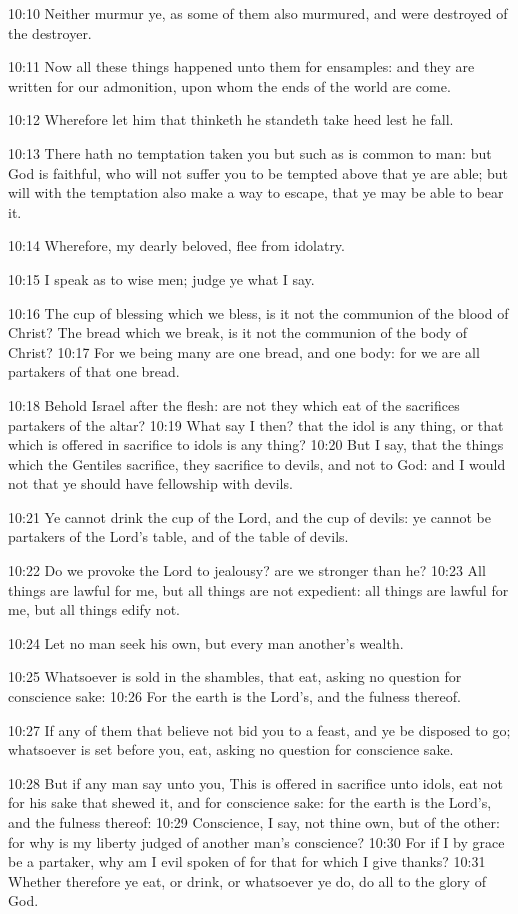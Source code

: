 10:10 Neither murmur ye, as some of them also murmured, and were
destroyed of the destroyer.

10:11 Now all these things happened unto them for ensamples: and they
are written for our admonition, upon whom the ends of the world are
come.

10:12 Wherefore let him that thinketh he standeth take heed lest he
fall.

10:13 There hath no temptation taken you but such as is common to man:
but God is faithful, who will not suffer you to be tempted above that
ye are able; but will with the temptation also make a way to escape,
that ye may be able to bear it.

10:14 Wherefore, my dearly beloved, flee from idolatry.

10:15 I speak as to wise men; judge ye what I say.

10:16 The cup of blessing which we bless, is it not the communion of
the blood of Christ? The bread which we break, is it not the communion
of the body of Christ?  10:17 For we being many are one bread, and one
body: for we are all partakers of that one bread.

10:18 Behold Israel after the flesh: are not they which eat of the
sacrifices partakers of the altar?  10:19 What say I then? that the
idol is any thing, or that which is offered in sacrifice to idols is
any thing?  10:20 But I say, that the things which the Gentiles
sacrifice, they sacrifice to devils, and not to God: and I would not
that ye should have fellowship with devils.

10:21 Ye cannot drink the cup of the Lord, and the cup of devils: ye
cannot be partakers of the Lord's table, and of the table of devils.

10:22 Do we provoke the Lord to jealousy? are we stronger than he?
10:23 All things are lawful for me, but all things are not expedient:
all things are lawful for me, but all things edify not.

10:24 Let no man seek his own, but every man another's wealth.

10:25 Whatsoever is sold in the shambles, that eat, asking no question
for conscience sake: 10:26 For the earth is the Lord's, and the
fulness thereof.

10:27 If any of them that believe not bid you to a feast, and ye be
disposed to go; whatsoever is set before you, eat, asking no question
for conscience sake.

10:28 But if any man say unto you, This is offered in sacrifice unto
idols, eat not for his sake that shewed it, and for conscience sake:
for the earth is the Lord's, and the fulness thereof: 10:29
Conscience, I say, not thine own, but of the other: for why is my
liberty judged of another man's conscience?  10:30 For if I by grace
be a partaker, why am I evil spoken of for that for which I give
thanks?  10:31 Whether therefore ye eat, or drink, or whatsoever ye
do, do all to the glory of God.

